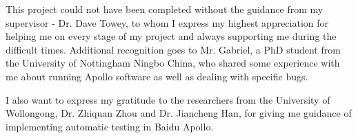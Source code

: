 \begin{acknowledgments}
This project could not have been completed without the guidance from my supervisor - Dr. Dave Towey, to whom I express my highest appreciation for helping me on every stage of my project and always supporting me during the difficult times. Additional recognition goes to Mr. Gabriel, a PhD student from the University of Nottingham Ningbo China, who shared some experience with me about running Apollo software as well as dealing with specific bugs. \newline

I also want to express my gratitude to the researchers from the University of Wollongong, Dr. Zhiquan Zhou and Dr. Jiancheng Han, for giving me guidance of implementing automatic testing in Baidu Apollo.


\clearpage
\end{acknowledgments}